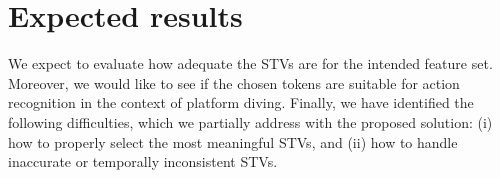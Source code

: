 \documentclass[10pt]{article}
\begin{document}
\section{Expected results}

We expect to evaluate how adequate the STVs are for the intended feature set. Moreover, we would like to see if the chosen tokens are suitable for action recognition in the context of platform diving. Finally, we have identified the following difficulties, which we partially address with the proposed solution: (i) how to properly select the most meaningful STVs, and (ii) how to handle inaccurate or temporally inconsistent STVs.


\end{document}
